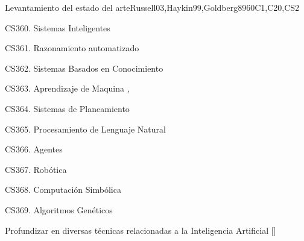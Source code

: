 \begin{syllabus}
\begin{unit}{}{Levantamiento del estado del arte}{Russell03,Haykin99,Goldberg89}{60}{C1,C20,CS2}
\begin{topics}
      \item CS360. Sistemas Inteligentes
      \item CS361. Razonamiento automatizado
      \item CS362. Sistemas Basados en Conocimiento
      \item CS363. Aprendizaje de Maquina \cite{Russell03},\cite{Haykin99}
      \item CS364. Sistemas de Planeamiento
      \item CS365. Procesamiento de Lenguaje Natural
      \item CS366. Agentes
      \item CS367. Robótica
      \item CS368. Computación Simbólica
      \item CS369. Algoritmos Genéticos \cite{Goldberg89}
\end{topics}
\begin{learningoutcomes}
  \item Profundizar en diversas técnicas relacionadas a la Inteligencia Artificial [\Usage]
\end{learningoutcomes}
\end{unit}



\begin{coursebibliography}
\end{coursebibliography}

\end{syllabus}
